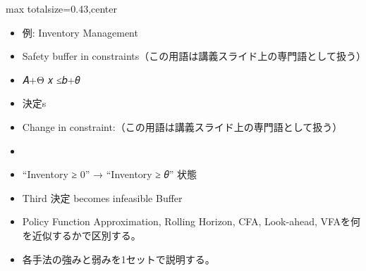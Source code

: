 \clearpage
{}
\begin{minipage}[t]{0.405\textwidth}
\begin{adjustbox}{max totalsize={\textwidth}{0.43\textheight},center}
\begin{minipage}{\textwidth}\scriptsize
{}\begin{itemize}
\item 例: Inventory Management
\item Safety buffer in constraints（この用語は講義スライド上の専門語として扱う）
\item 𝐴+Θ 𝑥 ≤𝑏+𝜃
\item 決定s
\item Change in constraint:（この用語は講義スライド上の専門語として扱う）
\item 
\item “Inventory ≥ 0” → “Inventory ≥ 𝜃” 状態
\item Third 決定 becomes infeasible Buffer
\end{itemize}\begin{itemize}
\item Policy Function Approximation, Rolling Horizon, CFA, Look-ahead, VFAを何を近似するかで区別する。
\item 各手法の強みと弱みを1セットで説明する。
\end{itemize}
\end{minipage}
\end{adjustbox}
\end{minipage}\hfill
